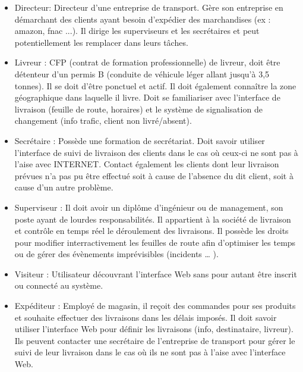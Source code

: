 \documentclass{report}
\begin{document}
\begin{itemize}

\item{Directeur:} Directeur d’une entreprise de transport. Gère son entreprise en démarchant des clients ayant besoin d’expédier des marchandises (ex : amazon, fnac ...). Il dirige les superviseurs et les secrétaires et peut potentiellement les remplacer dans leurs tâches.\\ 

\item{Livreur :} CFP (contrat de formation professionnelle) de livreur, doit être détenteur d’un permis B (conduite de véhicule léger allant jusqu’à 3,5 tonnes). Il se doit d’être ponctuel et actif. Il doit également connaître la zone géographique dans laquelle il livre.  Doit se familiariser avec l’interface de livraison (feuille de route, horaires) et le système de signalisation de changement (info trafic, client non livré/absent).\\

\item{Secrétaire :} Possède une formation de secrétariat. Doit savoir utiliser l’interface de suivi de livraison des clients dans le cas où ceux-ci ne sont pas à l’aise avec INTERNET. Contact également les clients dont leur livraison prévues n’a pas pu être effectué soit à cause de l’absence du dit client, soit à cause d’un autre problème.\\

\item{Superviseur :} Il doit avoir un diplôme d’ingénieur ou de management, son poste ayant de lourdes responsabilités. Il appartient à la société de livraison et contrôle en temps réel le déroulement des livraisons. Il possède les droits pour modifier interractivement les feuilles de route afin d’optimiser les temps ou de gérer des évènements imprévisibles (incidents … ).\\

\item{Visiteur :} Utilisateur découvrant l’interface Web sans pour autant être inscrit ou connecté au système.\\

\item{Expéditeur :} Employé de magasin, il reçoit des commandes pour ses produits et souhaite effectuer des livraisons dans les délais imposés. Il doit savoir utiliser l’interface Web pour définir les livraisons (info, destinataire, livreur). Ils peuvent contacter une secrétaire de l’entreprise de transport pour gérer le suivi de leur livraison dans le cas où ils ne sont pas à l’aise avec l’interface Web.\\


\end{itemize}
\end{document}
